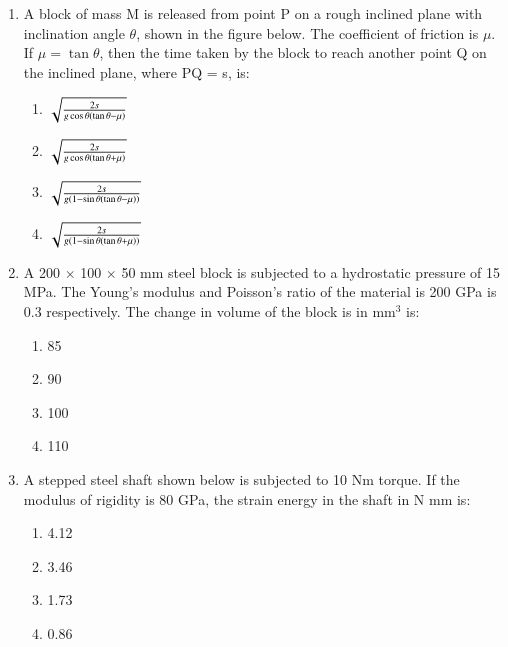 \documentclass[journal,9pt,onecolumn]{IEEEtran}
\begin{document}
\begin{enumerate}
\begin{multicols}{2}
\begin{enumerate}
\end{enumerate}
\end{multicols}


\item A block of mass M is released from point P on a rough inclined plane with inclination angle $\theta$, shown in the figure below. The coefficient of friction is $\mu$. If $\mu = \tan \theta$, then the time taken by the block to reach another point Q on the inclined plane, where PQ = s, is:
    \begin{center}
    
    \end{center}
 
\begin{multicols}{2}
\begin{enumerate}
     \item  $\sqrt{\frac{2s}{g \cos \theta\left(\tan \theta - \mu\right)}}$
    \item $ \sqrt{\frac{2s}{g \cos \theta \left(\tan \theta + \mu\right)}}$
    \item  $\sqrt{\frac{2s}{g \left(1 - \sin \theta \left(\tan \theta - \mu\right)\right)}}$
    \item  $\sqrt{\frac{2s}{g \left(1 - \sin \theta \left(\tan \theta + \mu\right)\right)}}$
\end{enumerate}
\end{multicols}

\item A 200 $\times$ 100 $\times$ 50 mm steel block is subjected to a hydrostatic pressure of 15 MPa. The Young's modulus and Poisson's ratio of the material is 200 GPa  is 0.3 respectively. The change in volume of the block is in mm$^3$ is:
\begin{multicols}{4}
\begin{enumerate}
    \item 85
    \item 90
    \item 100
    \item 110
\end{enumerate}
\end{multicols}


\item A stepped steel shaft shown below is subjected to 10 Nm torque. If the modulus of rigidity is 80 GPa, the strain energy in the shaft in N mm is:
    \begin{center}

 \end{center}
\begin{multicols}{4}
\begin{enumerate}
     \item 4.12
    \item 3.46
    \item 1.73
    \item 0.86
\end{enumerate}
\end{multicols}


\end{enumerate}
\end{document}
